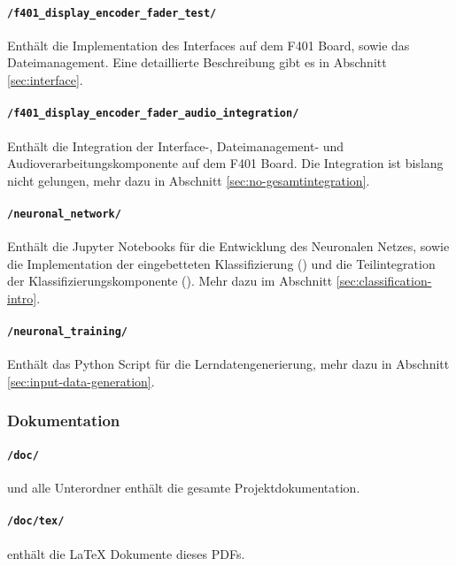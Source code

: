 \paragraph{\texttt{/f401\_display\_encoder\_fader\_test/}}

Enthält die Implementation des Interfaces auf dem F401 Board, sowie das Dateimanagement. Eine detaillierte Beschreibung gibt es in Abschnitt \ref{sec:interface}.

\paragraph{\texttt{/f401\_display\_encoder\_fader\_audio\_integration/}}

Enthält die Integration der Interface-, Dateimanagement- und Audioverarbeitungskomponente auf dem F401 Board. Die Integration ist bislang nicht gelungen, mehr dazu in Abschnitt \ref{sec:no-gesamtintegration}.

\paragraph{\texttt{/neuronal\_network/}}

Enthält die Jupyter Notebooks für die Entwicklung des Neuronalen Netzes, sowie die Implementation der eingebetteten Klassifizierung () und die Teilintegration der Klassifizierungskomponente (). Mehr dazu im Abschnitt \ref{sec:classification-intro}.

\paragraph{\texttt{/neuronal\_training/}}

Enthält das Python Script für die Lerndatengenerierung, mehr dazu in Abschnitt \ref{sec:input-data-generation}.

\subsubsection{Dokumentation}

\paragraph{\texttt{/doc/}} und alle Unterordner enthält die gesamte Projektdokumentation.

\paragraph{\texttt{/doc/tex/}} enthält die LaTeX Dokumente dieses PDFs.

